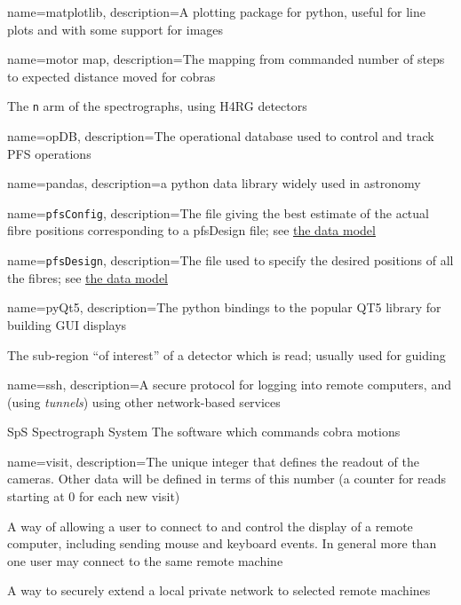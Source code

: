 
{
  name={matplotlib},
  description={A plotting package for python, useful for line plots and with some support for images}
}

{
  name={motor map},
  description={The mapping from commanded number of steps to expected distance moved for cobras}
}

{The \texttt{n} arm of the \PFS spectrographs, using \gls{H4RG} detectors}

{
  name={opDB},
  description={The operational database used to control and track \gls{PFS} operations}
}

{
  name={pandas},
  description={a python data library widely used in astronomy}
}

{
  name={\texttt{pfsConfig}},
  description={The file giving the best estimate of the actual fibre positions corresponding to
  a \gls{pfsDesign} file;
  see \href{https://github.com/Subaru-PFS/datamodel/blob/master/datamodel.txt}{the data model}}
}

{
  name={\texttt{pfsDesign}},
  description={The file used to specify the desired positions of all the fibres;
  see \href{https://github.com/Subaru-PFS/datamodel/blob/master/datamodel.txt}{the data model}}
}


{
  name={pyQt5},
  description={The python bindings to the popular QT5 library for building GUI displays}
}

{The sub-region ``of interest'' of a detector which is read;  usually used for guiding}


{
  name={ssh},
  description={A secure protocol for logging into remote computers, and (using \textit{tunnels})
    using other network-based services}
}

{SpS}
{Spectrograph System}
{The software which commands cobra motions}



{
  name={visit},
  description={The unique integer that defines the readout of the \SPS cameras.  Other data
  will be defined in terms of this number (\eg a counter for \AGC reads starting at 0 for
  each new \gls{visit})}
}

{A way of allowing a user to connect to and control the display of a remote computer, including sending
mouse and keyboard events.  In general more than one user may connect to the same remote machine}

{A way to securely extend a local private network to selected remote machines}
